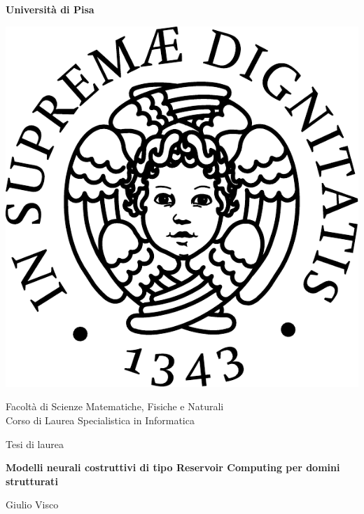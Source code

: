 
\begin{titlepage}
\begin{center}

\begin{large}\textbf{\sc Università di Pisa}\end{large}

\vspace{0.4cm}

\includegraphics[width=0.5\columnwidth]{img/cherubino}


\begin{large}
\sc Facolt\`a di Scienze Matematiche, Fisiche e Naturali \\
Corso di Laurea Specialistica in Informatica
\end{large}

\vspace{1.0cm}

\begin{large}
Tesi di laurea
\end{large}

\vspace{0.4cm}


{\Huge \bfseries \Large Modelli neurali costruttivi di tipo Reservoir Computing per domini strutturati}%


\vspace{0.4cm}

\begin{large}
Giulio Visco
\end{large}

\vspace{0.7cm}


\end{center}
\end{titlepage}
